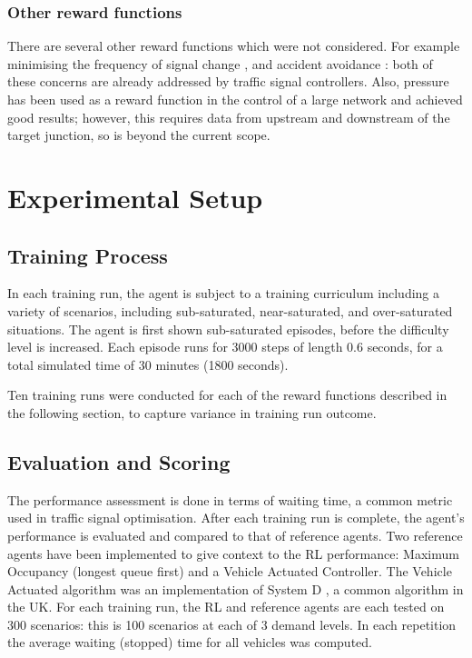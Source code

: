 \documentclass[conference]{IEEEtran}
\begin{document}
\subsubsection{Other reward functions}
There are several other reward functions which were not considered. For example minimising the frequency of signal change \cite{vanderpol2016} \cite{wei2018}, and accident avoidance \cite{vanderpol2016}: both of these concerns are already addressed by traffic signal controllers. Also, pressure has been used as a reward function in the control of a large network \cite{wei2019a} \cite{yau} \cite{wei2019} \cite{varaiya2013} \cite{wei2018}  \cite{chen2020} and achieved good results; however, this requires data from upstream and downstream of the target junction, so is beyond the current scope.

\section{Experimental Setup}\label{exp_setup}
\subsection{Training Process}

In each training run, the agent is subject to a training curriculum including a variety of scenarios, including sub-saturated, near-saturated, and over-saturated situations. The agent is first shown sub-saturated episodes, before the difficulty level is increased. Each episode runs for 3000 steps of length 0.6 seconds, for a total simulated time of 30 minutes (1800 seconds).

Ten training runs were conducted for each of the reward functions described in the following section, to capture variance in training run outcome.

\subsection{Evaluation and Scoring}
The performance assessment is done in terms of waiting time, a common metric used in traffic signal optimisation.
After each training run is complete, the agent's performance is evaluated and compared to that of reference agents. Two reference agents have been implemented to give context to the RL performance: Maximum Occupancy (longest queue first) and a Vehicle Actuated Controller. The Vehicle Actuated algorithm was an implementation of System D \cite{highways}, a common algorithm in the UK.  For each training run, the RL and reference agents are each tested on 300 scenarios: this is 100 scenarios at each of 3 demand levels. In each repetition the average waiting (stopped) time for all vehicles was computed.
\end{document}
